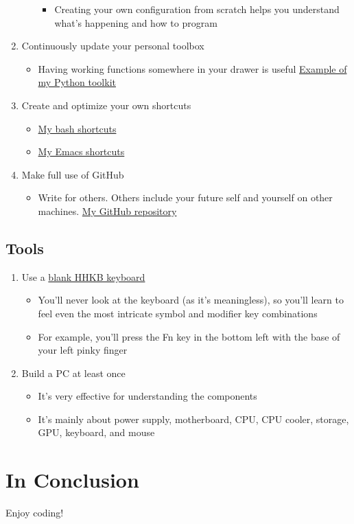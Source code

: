 \documentclass[a4paper,11pt]{article}
\begin{document}
\begin{enumerate}
\begin{itemize}
        \begin{itemize}
            \item Creating your own configuration from scratch helps you understand what's happening and how to program
        \end{itemize}
    \end{itemize}
    \item Continuously update your personal toolbox
    \begin{itemize}
        \item Having working functions somewhere in your drawer is useful \href{https://github.com/ywatanabe1989/mngs}{Example of my Python toolkit}
    \end{itemize}
    \item Create and optimize your own shortcuts
    \begin{itemize}
        \item \href{https://github.com/ywatanabe1989/.dotfiles-public/tree/main/.bash.d/all}{My bash shortcuts}
        \item \href{https://github.com/ywatanabe1989/.dotfiles-public/.emacs.d/}{My Emacs shortcuts}
    \end{itemize}
    \item Make full use of GitHub
    \begin{itemize}
        \item Write for others. Others include your future self and yourself on other machines. \href{https://github.com/ywatanabe1989/}{My GitHub repository}
    \end{itemize}
\end{enumerate}

\subsection{Tools}
\begin{enumerate}
    \item Use a \href{https://hhkeyboard.us/hhkb/pro-hybrid-type-s/sku/cg01000-297301}{blank HHKB keyboard}
    \begin{itemize}
        \item You'll never look at the keyboard (as it's meaningless), so you'll learn to feel even the most intricate symbol and modifier key combinations
        \item For example, you'll press the Fn key in the bottom left with the base of your left pinky finger
    \end{itemize}
    \item Build a PC at least once
    \begin{itemize}
        \item It's very effective for understanding the components
        \item It's mainly about power supply, motherboard, CPU, CPU cooler, storage, GPU, keyboard, and mouse
    \end{itemize}
\end{enumerate}

\section{In Conclusion}

Enjoy coding!
\end{document}
